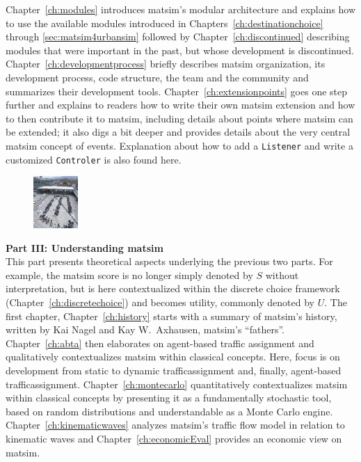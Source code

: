 Chapter~\ref{ch:modules} introduces \gls{matsim}'s modular architecture and explains how to use the available \glspl{module} introduced in Chapters~\ref{ch:destinationchoice} through \ref{sec:matsim4urbansim} followed by Chapter~\ref{ch:discontinued} describing modules that were important in the past, but whose development is discontinued.
Chapter~\ref{ch:developmentprocess} briefly describes \gls{matsim} organization, \ie its development process, code structure, the team and the community and summarizes their development tools. 
Chapter~\ref{ch:extensionpoints} goes one step further and explains to readers how to write their own \gls{matsim} \gls{extension} and how to then contribute it to \gls{matsim}, including details about points where \gls{matsim} can be extended; it also digs a bit deeper and provides details about the very central \gls{matsim} concept of \glspl{event}. Explanation about  how to add a \lstinline|Listener| and write a customized \lstinline|Controler| is also found here.

\begin{figure}
\vspace{-10pt}
  \begin{center}
    \includegraphics[width=0.15\textwidth]{images/DSCF5900.jpg}
  \end{center}
\end{figure}
\textbf{Part III: Understanding \acrshort{matsim}}\\
%
This part presents theoretical aspects underlying the previous two parts. For example, the \gls{matsim} \gls{score} is no longer simply denoted by $S$ without interpretation, but is here contextualized within the discrete choice framework (Chapter~\ref{ch:discretechoice}) and becomes \gls{utility}, commonly denoted by $U$. 
The first chapter, Chapter~\ref{ch:history} starts with a summary of \gls{matsim}'s history, written by Kai Nagel and Kay W.\ Axhausen, \gls{matsim}'s ``fathers''. 
Chapter~\ref{ch:abta} then elaborates on agent-based traffic assignment and qualitatively contextualizes \gls{matsim} within classical concepts. Here, focus is on development from static to dynamic \gls{trafficassignment} and, finally, agent-based \gls{trafficassignment}.  
Chapter~\ref{ch:montecarlo} quantitatively contextualizes \gls{matsim} within classical concepts by presenting it as a fundamentally stochastic tool, based on random distributions and understandable as a Monte Carlo engine.
Chapter~\ref{ch:kinematicwaves} analyzes \gls{matsim}'s traffic flow model in relation to kinematic waves and Chapter~\ref{ch:economicEval} provides an economic view on \gls{matsim}. 

